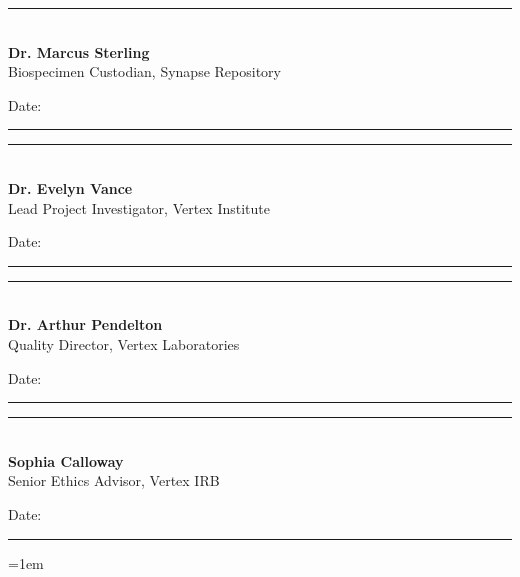\vspace{15pt}
\noindent
\begin{minipage}[t]{0.45\linewidth}
  \centering
  \rule{0.9\linewidth}{0.6pt}\\[2pt]
  {\small\sffamily\bfseries Dr. Marcus Sterling}\\[1pt]
  {\footnotesize\sffamily Biospecimen Custodian, Synapse Repository}\\[2pt]
  {\footnotesize\sffamily Date: \rule{1.5cm}{0.4pt}}
\end{minipage}
\hfill
\begin{minipage}[t]{0.45\linewidth}
  \centering
  \rule{0.9\linewidth}{0.6pt}\\[2pt]
  {\small\sffamily\bfseries Dr. Evelyn Vance}\\[1pt]
  {\footnotesize\sffamily Lead Project Investigator, Vertex Institute}\\[2pt]
  {\footnotesize\sffamily Date: \rule{1.5cm}{0.4pt}}
\end{minipage}
\par
\vspace{15pt}
\noindent
\begin{minipage}[t]{0.45\linewidth}
  \centering
  \rule{0.9\linewidth}{0.6pt}\\[2pt]
  {\small\sffamily\bfseries Dr. Arthur Pendelton}\\[1pt]
  {\footnotesize\sffamily Quality Director, Vertex Laboratories}\\[2pt]
  {\footnotesize\sffamily Date: \rule{1.5cm}{0.4pt}}
\end{minipage}
\hfill
\begin{minipage}[t]{0.45\linewidth}
  \centering
  \rule{0.9\linewidth}{0.6pt}\\[2pt]
  {\small\sffamily\bfseries Sophia Calloway}\\[1pt]
  {\footnotesize\sffamily Senior Ethics Advisor, Vertex IRB}\\[2pt]
  {\footnotesize\sffamily Date: \rule{1.5cm}{0.4pt}}
\end{minipage}

\vspace{25pt}
\emergencystretch=1em


